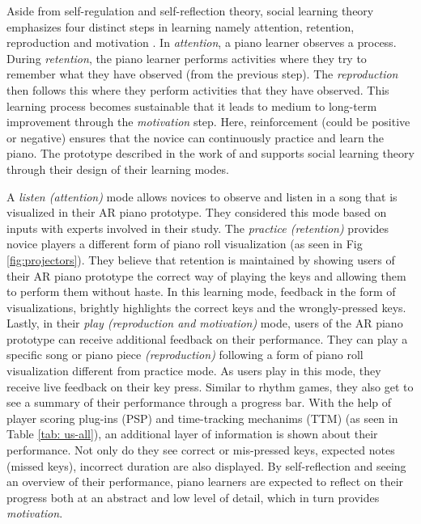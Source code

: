 \documentclass[sigchi, review]{acmart}
\begin{document}
Aside from self-regulation and self-reflection theory, social learning theory emphasizes four distinct steps in learning namely attention, retention, reproduction and motivation \cite{bandura1977social}. In \textit{attention}, a piano learner observes a process. During \textit{retention}, the piano learner performs activities where they try to remember what they have observed (from the previous step). The \textit{reproduction} then follows this where they perform activities that they have observed. This learning process becomes sustainable that it leads to medium to long-term improvement through the \textit{motivation} step. Here, reinforcement (could be positive or negative) ensures that the novice can continuously practice and learn the piano. The prototype described in the work of \citet{weing2013piano} and \citet{rogers2014piano} supports social learning theory through their design of their learning modes. 

A \textit{listen (attention)} mode allows novices to observe and listen in a song that is visualized in their AR piano prototype. They considered this mode based on inputs with experts involved in their study. The \textit{practice (retention)} provides novice players a different form of piano roll visualization (as seen in Fig \ref{fig:projectors}). They believe that retention is maintained by showing users of their AR piano prototype the correct way of playing the keys and allowing them to perform them without haste. In this learning mode, feedback in the form of visualizations, brightly highlights the correct keys and the wrongly-pressed keys. Lastly, in their \textit{play (reproduction and motivation)} mode, users of the AR piano prototype can receive additional feedback on their performance. They can play a specific song or piano piece \textit{(reproduction)} following a form of piano roll visualization different from practice mode. As users play in this mode, they receive live feedback on their key press. Similar to rhythm games, they also get to see a summary of their performance through a progress bar. With the help of player scoring plug-ins (PSP) and time-tracking mechanims (TTM) (as seen in Table \ref{tab: us-all}), an additional layer of information is shown about their performance. Not only do they see correct or mis-pressed keys, expected notes (missed keys), incorrect duration are also displayed. By self-reflection and seeing an overview of their performance, piano learners are expected to reflect on their progress both at an abstract and low level of detail, which in turn provides \textit{motivation}.
\end{document}

